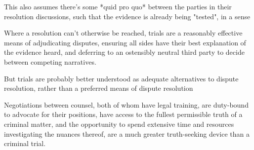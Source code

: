 This also assumes there's some *quid pro quo* between the parties in their resolution discussions, such that the evidence is already being "tested", in a sense

Where a resolution can't otherwise be reached, trials are a reasonably effective means of adjudicating disputes, ensuring all sides have their best explanation of the evidence heard, and deferring to an ostensibly neutral third party to decide between competing narratives.

But trials are probably better understood as adequate alternatives to dispute resolution, rather than a preferred means of dispute resolution

Negotiations between counsel, both of whom have legal training, are duty-bound to advocate for their positions, have access to the fullest permissible truth of a criminal matter, and the opportunity to spend extensive time and resources investigating the nuances thereof, are a much greater truth-seeking device than a criminal trial.